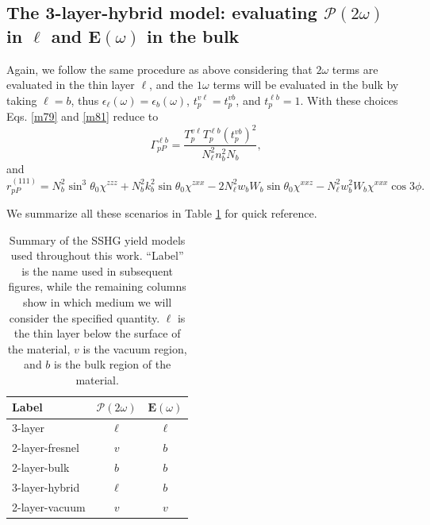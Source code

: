 
\subsection{The 3-layer-hybrid model: evaluating
\texorpdfstring{$\boldsymbol{\mathcal{P}}(2\omega)$ in $\ell$}{P(2w) in l} and
\texorpdfstring{$\mathbf{E}(\omega)$}{E(w)} in the bulk}
\label{sec:2-layer-hybrid}

Again, we follow the same procedure as above considering that $2\omega$ terms
are evaluated in the thin layer $\ell$, and the $1\omega$ terms will be
evaluated in the bulk by taking $\ell = b$, thus $\epsilon_{\ell}(\omega) =
\epsilon_{b}(\omega)$, $t^{v\ell}_{p} = t^{vb}_{p}$, and $t^{\ell b}_{p} = 1$.
With these choices Eqs. \eqref{m79} and \eqref{m81} reduce to
\begin{equation}
\Gamma^{\ell b}_{pP}=
\frac{T^{v\ell}_{p}T^{\ell b}_{p}\left(t^{vb}_{p}\right)^{2}}
  {N^{2}_{\ell}n^{2}_{b}N_{b}},
\end{equation}
and
\begin{equation}
r^{(111)}_{pP} = 
  N^{2}_{b}\sin^{3}\theta_{0}\chi^{zzz}
+ N^{2}_{b}k^{2}_{b}\sin\theta_{0}\chi^{zxx}
- 2N^{2}_{\ell}w_{b}W_{b}\sin\theta_{0}\chi^{xxz}
- N^{2}_{\ell}w^{2}_{b}W_{b}\chi^{xxx}\cos3\phi.
\end{equation}

We summarize all these scenarios in Table \ref{tab:models} for quick reference.

\begin{table}[t]
\centering
\begin{tabular}{| l | c | c |}
\hline 
Label         &  $\boldsymbol{\mathcal{P}}(2\omega)$  &  $\mathbf{E}(\omega)$ \\
\hline 
3-layer         &          $\ell$           &      $\ell$   \\
2-layer-fresnel &            $v$            &        $b$    \\
2-layer-bulk    &            $b$            &        $b$    \\
3-layer-hybrid  &          $\ell$           &        $b$    \\
2-layer-vacuum  &            $v$            &        $v$    \\
\hline 
\end{tabular}
\caption{Summary of the SSHG yield models used throughout this work. ``Label''
is the name used in subsequent figures, while the remaining columns show in
which medium we will consider the specified quantity. $\ell$ is the thin layer
below the surface of the material, $v$ is the vacuum region, and $b$ is the bulk
region of the material.}
\label{tab:models}
\end{table}

\stopcontents[chapters]
